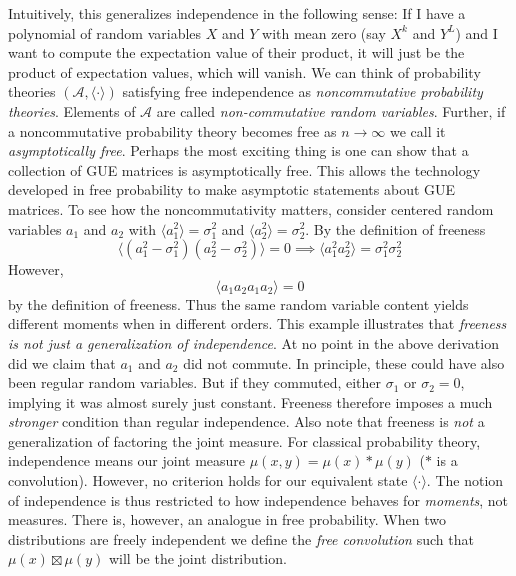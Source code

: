 \documentclass[11pt]{article}
\theoremstyle{definition}
\begin{document}
Intuitively, this generalizes independence in the following sense: If I have a polynomial of random variables $X$ and $Y$ with mean zero (say $X^k$ and $Y^L$) and I want to compute the expectation value of their product, it will just be the product of expectation values, which will vanish. We can think of probability theories $(\mathcal{A},\langle \cdot \rangle)$ satisfying free independence as \textit{noncommutative probability theories}. Elements of $\mathcal{A}$ are called \textit{non-commutative random variables}. Further, if a noncommutative probability theory becomes free as $n\to \infty$ we call it \textit{asymptotically free}. Perhaps the most exciting thing is one can show that a collection of GUE matrices is asymptotically free. This allows the technology developed in free probability to make asymptotic statements about GUE matrices. To see how the noncommutativity matters, consider centered random variables $a_1$ and $a_2$ with $\langle a_1^2 \rangle=\sigma_1^2$ and $\langle a_2^2 \rangle=\sigma_2^2$. By the definition of freeness 
\begin{equation}
    \langle (a_1^2-\sigma_1^2)(a_2^2-\sigma_2^2)\rangle =0 \implies  \langle a_1^2a_2^2 \rangle=\sigma_1^2\sigma_2^2
\end{equation}
However, 
\begin{equation}
    \langle a_1a_2a_1a_2 \rangle =0
\end{equation}
by the definition of freeness. Thus the same random variable content yields different moments when in different orders. This example illustrates that \textit{freeness is not just a generalization of independence}. At no point in the above derivation did we claim that $a_1$ and $a_2$ did not commute. In principle, these could have also been regular random variables. But if they commuted, either $\sigma_1$ or $\sigma_2=0$, implying it was almost surely just constant. Freeness therefore imposes a much \textit{stronger} condition than regular independence. Also note that freeness is \textit{not} a generalization of factoring the joint measure. For classical probability theory, independence means our joint measure $\mu(x,y)=\mu(x) *\mu(y) $ ($*$ is a convolution). However, no criterion holds for our equivalent state $\langle \cdot \rangle$. The notion of independence is thus restricted to how independence behaves for \textit{moments}, not measures. There is, however, an analogue in free probability. When two distributions are freely independent we define the \textit{free convolution} such that $\mu(x) \boxtimes \mu(y)  $ will be the joint distribution.  
\end{document}
